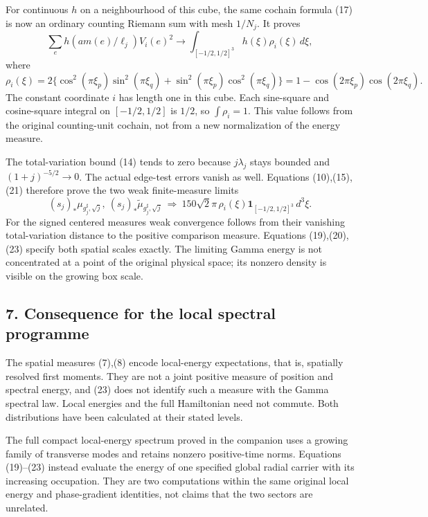 \documentclass[
  11pt,
]{article}
\begin{document}
For continuous \(h\) on a neighbourhood of this cube, the same cochain
formula (17) is now an ordinary counting Riemann sum with mesh
\(1/N_j\). It proves \[
 \sum_e h(am(e)/\ell_j)V_i(e)^2
 \longrightarrow\int_{[-1/2,1/2]^3}h(\xi)\rho_i(\xi)\,d\xi,
 \tag{21}
\] where \[
 \boxed{\rho_i(\xi)=
 2\{\cos^2(\pi\xi_p)\sin^2(\pi\xi_q)
       +\sin^2(\pi\xi_p)\cos^2(\pi\xi_q)\}
 =1-\cos(2\pi\xi_p)\cos(2\pi\xi_q).}
 \tag{22}
\] The constant coordinate \(i\) has length one in this cube. Each
sine-square and cosine-square integral on \([-1/2,1/2]\) is \(1/2\), so
\(\int\rho_i=1\). This value follows from the original counting-unit
cochain, not from a new normalization of the energy measure.

The total-variation bound (14) tends to zero because \(j\lambda_j\)
stays bounded and \((1+j)^{-5/2}\to0\). The actual edge-test errors
vanish as well. Equations (10),(15),(21) therefore prove the two weak
finite-measure limits \[
 \boxed{(s_j)_*\mu_{g_j^\sharp,\sqrt j},\
        (s_j)_*\widetilde\mu_{g_j^\sharp,\sqrt j}
 \ \Longrightarrow\
 150\sqrt2\pi\,\rho_i(\xi)
                    \mathbf1_{[-1/2,1/2]^3}\,d^3\xi .}
 \tag{23}
\] For the signed centered measures weak convergence follows from their
vanishing total-variation distance to the positive comparison measure.
Equations (19),(20),(23) specify both spatial scales exactly. The
limiting Gamma energy is not concentrated at a point of the original
physical space; its nonzero density is visible on the growing box scale.

\subsection{7. Consequence for the local spectral
programme}\label{weak-coupling-part-12-consequence-for-the-local-spectral-programme}

The spatial measures (7),(8) encode local-energy expectations, that is,
spatially resolved first moments. They are not a joint positive measure
of position and spectral energy, and (23) does not identify such a
measure with the Gamma spectral law. Local energies and the full
Hamiltonian need not commute. Both distributions have been calculated at
their stated levels.

The full compact local-energy spectrum proved in the companion uses a
growing family of transverse modes and retains nonzero positive-time
norms. Equations (19)--(23) instead evaluate the energy of one specified
global radial carrier with its increasing occupation. They are two
computations within the same original local energy and phase-gradient
identities, not claims that the two sectors are unrelated.
\end{document}

